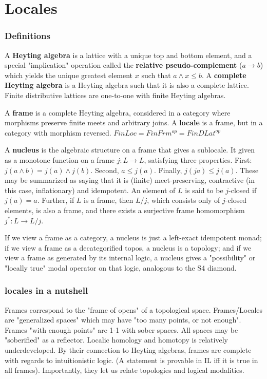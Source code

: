 \documentclass{beamer}
\begin{document}
\section{Locales}
\begin{frame}
\frametitle{Definitions}
A \textbf{Heyting algebra} is a lattice with a unique top and bottom element, and a special "implication" operation called the \textbf{relative pseudo-complement} (\(a \rightarrow b\)) which yields the unique greatest element \(x\) such that \(a \wedge x \le b\). A \textbf{complete Heyting algebra} is a Heyting algebra such that it is also a complete lattice. Finite distributive lattices are one-to-one with finite Heyting algebras.

A \textbf{frame} is a complete Heyting algebra, considered in a category where morphisms preserve finite meets and arbitrary joins. A \textbf{locale} is a frame, but in a category with morphism reversed. \(FinLoc = FinFrm^{op} = FinDLat^{op}\)
\end{frame}

\begin{frame}
A \textbf{nucleus} is the algebraic structure on a frame that gives a sublocale. It given as a monotone function on a frame \(j : L \rightarrow L\), satisfying three properties. First: \(j(a \wedge b) = j(a) \wedge j(b)\). Second, \(a \le j(a)\). Finally, \(j(ja) \le j(a)\). These may be summarized as saying that it is (finite) meet-preserving, contractive (in this case, inflationary) and idempotent. An element of \(L\) is said to be \(j\)-closed if \(j(a)=a\). Further, if \(L\) is a frame, then \(L/j\), which consists only of \(j\)-closed elements, is also a frame, and there exists a surjective frame homomorphism \(j^* : L \rightarrow L/j\). 

If we view a frame as a category, a nucleus is just a left-exact idempotent monad; if we view a frame as a decategorified topos, a nucleus is a topology; and if we view a frame as generated by its internal logic, a nucleus gives a "possibility" or "locally true" modal operator on that logic, analogous to the S4 diamond.
\end{frame}

\begin{frame}
\frametitle{locales in a nutshell}
Frames correspond to the "frame of opens" of a topological space. Frames/Locales are "generalized spaces" which may have "too many points, or not enough". Frames "with enough points" are 1-1 with sober spaces. All spaces may be "soberified" as a reflector.  Localic homology and homotopy is relatively underdeveloped. By their connection to Heyting algebras, frames are complete with regards to intuitionistic logic. (A statement is provable in IL iff it is true in all frames). Importantly, they let us relate topologies and logical modalities.
\end{frame}
\end{document}
